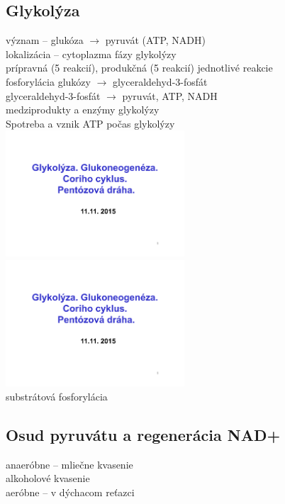 \subsection*{Glykolýza}
\tab význam -- glukóza $\rightarrow$ pyruvát (ATP, NADH)\\
\tab lokalizácia -- cytoplazma
 fázy glykolýzy\\
\tab \tab prípravná (5 reakcií), produkčná (5 reakcií)
\tab jednotlivé reakcie\\
\tab \tab fosforylácia glukózy $\rightarrow$ glyceraldehyd-3-fosfát\\
\tab \tab glyceraldehyd-3-fosfát $\rightarrow$ pyruvát, ATP, NADH\\
\tab medziprodukty a enzýmy glykolýzy\\
Spotreba a vznik ATP počas glykolýzy\\
\includegraphics[width=0.5\textwidth, page=6]{materials/Biochemia/Prezentacie_Biochemia/06_Glyko_Gluko_Pento.pdf}
\includegraphics[width=0.5\textwidth, page=7]{materials/Biochemia/Prezentacie_Biochemia/06_Glyko_Gluko_Pento.pdf}
\\
substrátová fosforylácia\\
\subsection*{Osud pyruvátu a regenerácia NAD+}
anaeróbne -- mliečne kvasenie\\
alkoholové kvasenie\\
aeróbne -- v dýchacom reťazci\\
